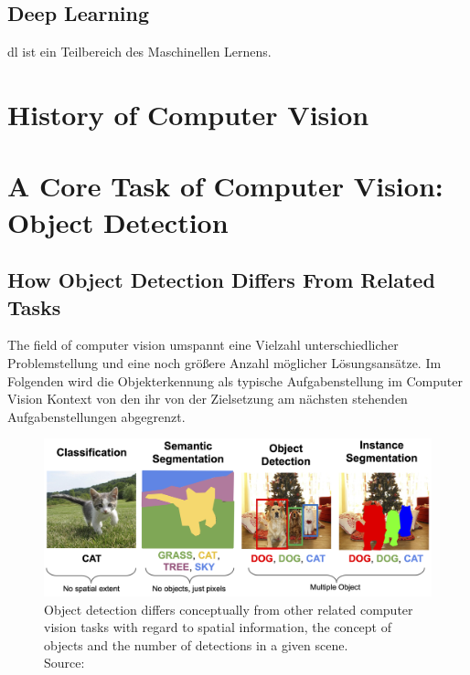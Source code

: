 \documentclass[
			   fontsize=11pt,
               paper=a4,
               bibliography=totoc,
               idxtotoc,
               headsepline,
               footsepline,
               footinclude=false,
               BCOR=12mm,
               DIV=13,
               openany,   %
               ]
               {scrbook}
\begin{document}
\subsection{Deep Learning}

\Gls{dl} ist ein Teilbereich des Maschinellen Lernens. 

\section{History of Computer Vision}

\section{A Core Task of Computer Vision: Object Detection}

\subsection{How Object Detection Differs From Related Tasks}

The field of computer vision umspannt eine Vielzahl unterschiedlicher Problemstellung und eine noch größere Anzahl möglicher Lösungsansätze. Im Folgenden wird die Objekterkennung als typische Aufgabenstellung im Computer Vision Kontext von den ihr von der Zielsetzung am nächsten stehenden Aufgabenstellungen abgegrenzt.

\begin{figure}[H] %
	\centering
	\includegraphics[width=\textwidth]{figures/detection_related_tasks.png}
	\caption[Typical Computer Vision Tasks]{Object detection differs conceptually from other related computer vision tasks with regard to spatial information, the concept of objects and the number of detections in a given scene.\\
		\tiny{Source:~\cite{cvTasks}}}
	\label{fig:cvTasks} %
\end{figure}
\end{document}
